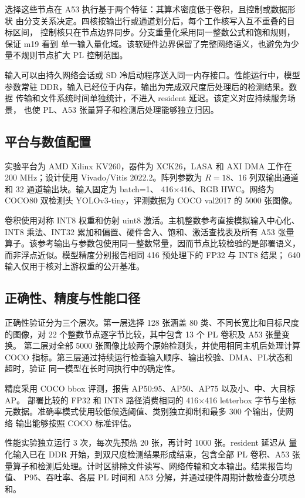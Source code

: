 选择这些节点在 A53 执行基于两个特征：其算术密度低于卷积，且控制或数据形状
由分支关系决定。四核按输出行或通道划分后，每个工作核写入互不重叠的目标区间，
控制核只在节点边界同步。分支重量化采用同一整数公式和饱和规则，保证 m19 看到
单一输入量化域。该软硬件边界保留了完整网络语义，也避免为少量不规则节点扩大
PL 控制范围。

输入可以由持久网络会话或 SD 冷启动程序送入同一内存接口。性能运行中，模型
参数常驻 DDR，输入已经位于内存，输出为完成双尺度后处理后的检测结果。数据
传输和文件系统时间单独统计，不进入 resident 延迟。该定义对应持续服务场景，
也使 PL、A53 张量算子和检测后处理能够独立归因。

\subsection{平台与数值配置}

实验平台为 AMD Xilinx KV260，器件为 XCK26，LASA 和 AXI DMA 工作在
200 MHz；设计使用 Vivado/Vitis 2022.2\cite{xilinxkv260}。阵列参数为
$R=18$、16 列双输出通道和 32 通道输出块。输入固定为 batch=1、
416$\times$416、RGB HWC。网络为 COCO80 双检测头 YOLOv3-tiny，评测数据为
COCO val2017 的 5000 张图像\cite{coco2014}。

卷积使用对称 INT8 权重和仿射 uint8 激活。主机整数参考直接模拟输入中心化、
INT8 乘法、INT32 累加和偏置、硬件舍入、饱和、激活查找表及所有 A53 张量
算子。该参考输出与参数包使用同一整数常量，因而节点比较检验的是部署语义，
而非浮点近似。模型精度分别报告相同 416 预处理下的 FP32 与 INT8 结果；
640 输入仅用于核对上游权重的公开基准。

\subsection{正确性、精度与性能口径}

正确性验证分为三个层次。第一层选择 128 张涵盖 80 类、不同长宽比和目标尺度
的图像，对 22 个整数节点逐字节比较，其中包含 13 个 PL 卷积及 A53 张量变换。
第二层对全部 5000 张图像比较两个原始检测头，并使用相同主机后处理计算 COCO
指标。第三层通过持续运行检查输入顺序、输出校验、DMA、PL状态和超时，验证
同一模型在长时间执行中的确定性。

精度采用 COCO bbox 评测，报告 AP50:95、AP50、AP75 以及小、中、大目标 AP。
部署比较的 FP32 和 INT8 路径消费相同的 416$\times$416 letterbox 字节与坐标
元数据。准确率模式使用较低候选阈值、类别独立抑制和最多 300 个输出，使网络
输出能够按照 COCO 标准评估。

性能实验独立运行 3 次，每次先预热 20 张，再计时 1000 张。resident 延迟从
量化输入已在 DDR 开始，到双尺度检测结果形成结束，包含全部 PL 卷积、A53
张量算子和检测后处理。计时区排除文件读写、网络传输和文本输出。结果报告均值、
P95、吞吐率、各层 PL 时间和 A53 分解，并通过硬件周期计数检查分项总和。

